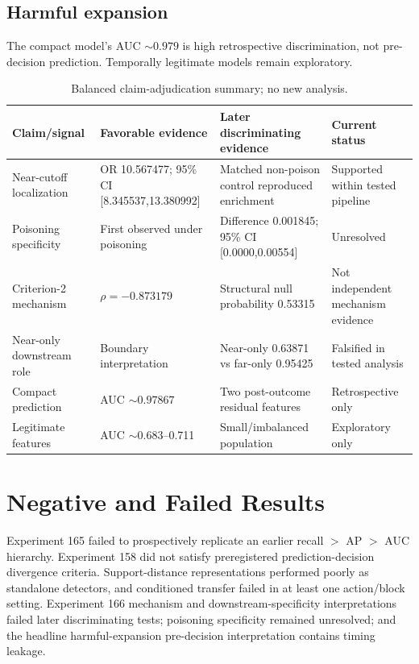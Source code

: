 \documentclass[preprint,12pt]{elsarticle}
\begin{document}
\subsection{Harmful expansion} The compact model's AUC $\sim0.979$ is high retrospective discrimination, not pre-decision prediction. Temporally legitimate models remain exploratory.
\begin{table}[t]\centering\caption{Balanced claim-adjudication summary; no new analysis.}\label{tab:adjudication}\begin{tabular}{p{}p{}p{}p{}}\toprule Claim/signal & Favorable evidence & Later discriminating evidence & Current status\\\midrule Near-cutoff localization & OR 10.567477; 95\% CI [8.345537,13.380992] & Matched non-poison control reproduced enrichment & Supported within tested pipeline\\ Poisoning specificity & First observed under poisoning & Difference 0.001845; 95\% CI [0.0000,0.00554] & Unresolved\\ Criterion-2 mechanism & $\rho=-0.873179$ & Structural null probability 0.53315 & Not independent mechanism evidence\\ Near-only downstream role & Boundary interpretation & Near-only 0.63871 vs far-only 0.95425 & Falsified in tested analysis\\ Compact prediction & AUC $\sim0.97867$ & Two post-outcome residual features & Retrospective only\\ Legitimate features & AUC $\sim0.683$--0.711 & Small/imbalanced population & Exploratory only\\\bottomrule\end{tabular}\end{table}
\section{Negative and Failed Results} Experiment 165 failed to prospectively replicate an earlier recall $>$ AP $>$ AUC hierarchy. Experiment 158 did not satisfy preregistered prediction-decision divergence criteria. Support-distance representations performed poorly as standalone detectors, and conditioned transfer failed in at least one action/block setting. Experiment 166 mechanism and downstream-specificity interpretations failed later discriminating tests; poisoning specificity remained unresolved; and the headline harmful-expansion pre-decision interpretation contains timing leakage.
\end{document}
